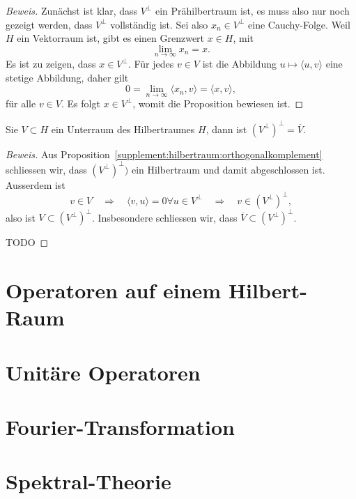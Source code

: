 \begin{proof}[Beweis]
Zunächst ist klar, dass $V^\perp$ ein Prähilbertraum ist, es muss
also nur noch gezeigt werden, dass $V^\perp$ vollständig ist.
Sei also $x_n\in V^\perp$ eine Cauchy-Folge.
Weil $H$ ein Vektorraum ist, gibt es einen Grenzwert $x\in H$, mit
\[
\lim_{n\to\infty} x_n=x.
\]
Es ist zu zeigen, dass $x\in V^\perp$.
Für jedes $v\in V$ ist die Abbildung $u\mapsto \langle u,v\rangle$ eine
stetige Abbildung, daher gilt
\[
0=\lim_{n\to\infty} \langle x_n,v\rangle = \langle x,v\rangle,
\]
für alle $v\in V$.
Es folgt $x\in V^\perp$, womit die Proposition bewiesen ist.
\end{proof}

\begin{proposition}
Sie $V\subset H$ ein Unterraum des Hilbertraumes $H$, dann ist
$(V^\perp)^\perp=\overline V$.
\end{proposition}

\begin{proof}[Beweis]
Aus Proposition~\ref{supplement:hilbertraum:orthogonalkomplement}
schliessen wir, dass $(V^\perp)^\perp)$ ein Hilbertraum und damit
abgeschlossen ist.
Ausserdem ist
\[
v\in V
\quad\Rightarrow\quad
\langle v,u\rangle = 0\forall u\in V^\perp
\quad\Rightarrow\quad
v\in (V^\perp)^\perp,
\]
also ist $V\subset (V^\perp)^\perp$.
Insbesondere schliessen wir, dass $\overline V\subset (V^\perp)^\perp$.

TODO
\end{proof}

\section{Operatoren auf einem Hilbert-Raum}

\section{Unitäre Operatoren}

\section{Fourier-Transformation}

\section{Spektral-Theorie}




